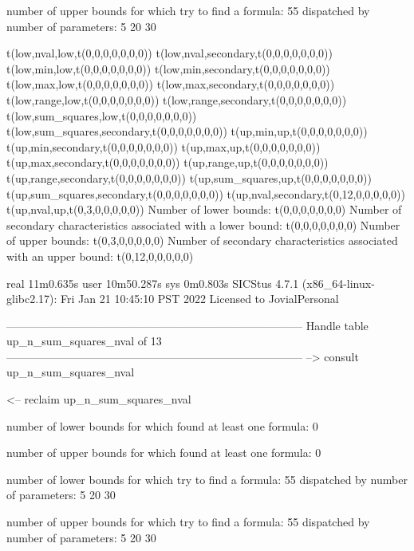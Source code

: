 number of upper bounds for which try to find a formula: 55
dispatched by number of parameters: 5  20  30

t(low,nval,low,t(0,0,0,0,0,0,0))
t(low,nval,secondary,t(0,0,0,0,0,0,0))
t(low,min,low,t(0,0,0,0,0,0,0))
t(low,min,secondary,t(0,0,0,0,0,0,0))
t(low,max,low,t(0,0,0,0,0,0,0))
t(low,max,secondary,t(0,0,0,0,0,0,0))
t(low,range,low,t(0,0,0,0,0,0,0))
t(low,range,secondary,t(0,0,0,0,0,0,0))
t(low,sum_squares,low,t(0,0,0,0,0,0,0))
t(low,sum_squares,secondary,t(0,0,0,0,0,0,0))
t(up,min,up,t(0,0,0,0,0,0,0))
t(up,min,secondary,t(0,0,0,0,0,0,0))
t(up,max,up,t(0,0,0,0,0,0,0))
t(up,max,secondary,t(0,0,0,0,0,0,0))
t(up,range,up,t(0,0,0,0,0,0,0))
t(up,range,secondary,t(0,0,0,0,0,0,0))
t(up,sum_squares,up,t(0,0,0,0,0,0,0))
t(up,sum_squares,secondary,t(0,0,0,0,0,0,0))
t(up,nval,secondary,t(0,12,0,0,0,0,0))
t(up,nval,up,t(0,3,0,0,0,0,0))
Number of lower bounds:                                             t(0,0,0,0,0,0,0)
Number of secondary characteristics associated with a lower bound:  t(0,0,0,0,0,0,0)
Number of upper bounds:                                             t(0,3,0,0,0,0,0)
Number of secondary characteristics associated with an upper bound: t(0,12,0,0,0,0,0)

real	11m0.635s
user	10m50.287s
sys	0m0.803s
SICStus 4.7.1 (x86_64-linux-glibc2.17): Fri Jan 21 10:45:10 PST 2022
Licensed to JovialPersonal


--------------------------------------------------------------------------------
Handle table up_n_sum_squares_nval of 13
--------------------------------------------------------------------------------
--> consult up_n_sum_squares_nval

<-- reclaim up_n_sum_squares_nval

number of lower bounds for which found at least one formula: 0

number of upper bounds for which found at least one formula: 0

number of lower bounds for which try to find a formula: 55
dispatched by number of parameters: 5  20  30

number of upper bounds for which try to find a formula: 55
dispatched by number of parameters: 5  20  30

